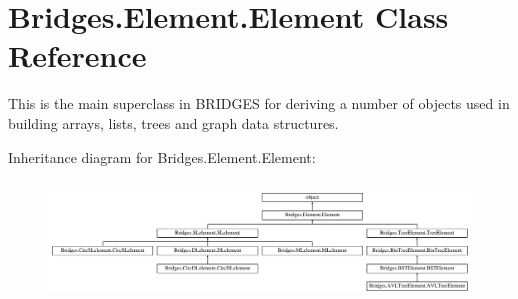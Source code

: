 \hypertarget{class_bridges_1_1_element_1_1_element}{}\section{Bridges.\+Element.\+Element Class Reference}
\label{class_bridges_1_1_element_1_1_element}


This is the main superclass in B\+R\+I\+D\+G\+E\+S for deriving a number of objects used in building arrays, lists, trees and graph data structures.  


Inheritance diagram for Bridges.\+Element.\+Element\+:\begin{figure}[H]
\begin{center}
\leavevmode
\includegraphics[height=3.218391cm]{class_bridges_1_1_element_1_1_element}
\end{center}
\end{figure}

